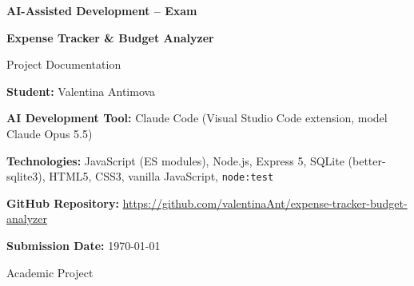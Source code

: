 \documentclass[11pt,a4paper]{article}
\newcommand{\repolink}{\url{https://github.com/valentinaAnt/expense-tracker-budget-analyzer}}
\begin{document}

\begin{titlepage}
    \centering

    \vspace*{2cm}

    {\Large\textbf{AI-Assisted Development -- Exam}\par}

    \vspace{1.5cm}

    {\Huge\bfseries Expense Tracker \& Budget Analyzer\par}

    \vspace{0.7cm}

    {\large Project Documentation\par}

    \vspace{2cm}

    \begin{flushleft}
        \textbf{Student:} Valentina Antimova

        \vspace{0.4cm}

        \textbf{AI Development Tool:}
        Claude Code (Visual Studio Code extension, model Claude Opus 5.5)

        \vspace{0.4cm}

        \textbf{Technologies:}
        JavaScript (ES modules), Node.js, Express 5, SQLite (better-sqlite3),
        HTML5, CSS3, vanilla JavaScript, \texttt{node:test}

        \vspace{0.4cm}

        \textbf{GitHub Repository:}
        \repolink

        \vspace{0.4cm}

        \textbf{Submission Date:} \today
    \end{flushleft}

    \vfill

    {\large Academic Project\par}
\end{titlepage}

\tableofcontents
\newpage
{}

\end{document}
